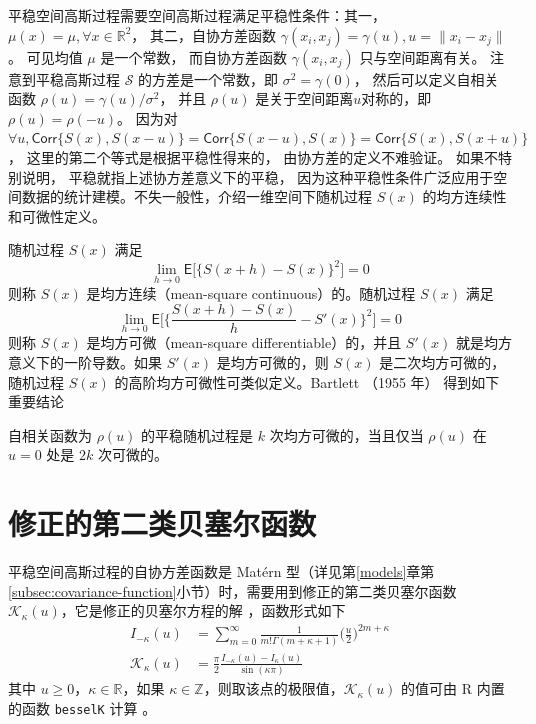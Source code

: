 \documentclass[12pt,a4paper,UTF8,twoside]{book}
\theoremstyle{definition}
\theoremstyle{definition}
\theoremstyle{definition}
\theoremstyle{remark}
\let\BeginKnitrBlock\begin \let\EndKnitrBlock\end
\begin{document}
平稳空间高斯过程需要空间高斯过程满足平稳性条件：其一，
\(\mu(x) = \mu, \forall x \in \mathbb{R}^2\)， 其二，自协方差函数
\(\gamma(x_i,x_j) = \gamma(u),u=\|x_{i} - x_{j}\|\)。 可见均值 \(\mu\)
是一个常数， 而自协方差函数 \(\gamma(x_i,x_j)\) 只与空间距离有关。
注意到平稳高斯过程 \(\mathcal{S}\) 的方差是一个常数，即
\(\sigma^2 = \gamma(0)\)， 然后可以定义自相关函数
\(\rho(u) = \gamma(u)/\sigma^2\)， 并且 \(\rho(u)\)
是关于空间距离\(u\)对称的，即 \(\rho(u) = \rho(-u)\)。 因为对
\(\forall u, \mathsf{Corr}\{S(x),S(x-u)\} = \mathsf{Corr}\{S(x-u), S(x)\} = \mathsf{Corr}\{S(x),S(x+u)\}\)，
这里的第二个等式是根据平稳性得来的， 由协方差的定义不难验证。
如果不特别说明， 平稳就指上述协方差意义下的平稳，
因为这种平稳性条件广泛应用于空间数据的统计建模。不失一般性，介绍一维空间下随机过程
\(S(x)\) 的均方连续性和可微性定义。

\BeginKnitrBlock{definition}[连续性和可微性]
\protect\hypertarget{def:continuous-differentiable}{}{\label{def:continuous-differentiable}
{} }随机过程 \(S(x)\) 满足
\[ \lim_{h \to 0} \mathsf{E}\big[ \{S(x + h) - S(x)\}^{2} \big] = 0 \]
\noindent 则称 \(S(x)\) 是均方连续（mean-square continuous）的。随机过程
\(S(x)\) 满足
\[ \lim_{h \to 0} \mathsf{E} \big[ \{ \frac{S(x+h) - S(x)}{h} - S'(x) \}^2 \big] = 0 \]
\noindent 则称 \(S(x)\) 是均方可微（mean-square differentiable）的，并且
\(S'(x)\) 就是均方意义下的一阶导数。如果 \(S'(x)\) 是均方可微的，则
\(S(x)\) 是二次均方可微的，随机过程 \(S(x)\)
的高阶均方可微性可类似定义\citep{Diggle2007}。Bartlett （1955 年）
\citep{Bartlett1955} 得到如下重要结论
\EndKnitrBlock{definition}

\BeginKnitrBlock{theorem}[平稳随机过程的可微性]
\protect\hypertarget{thm:stationary-mean-square-properties}{}{\label{thm:stationary-mean-square-properties}
{} }自相关函数为 \(\rho(u)\)
的平稳随机过程是 \(k\) 次均方可微的，当且仅当 \(\rho(u)\) 在 \(u = 0\)
处是 \(2k\) 次可微的。
\EndKnitrBlock{theorem}

\hypertarget{sec:modified-bessel-function}{%
\section{修正的第二类贝塞尔函数}\label{sec:modified-bessel-function}}

平稳空间高斯过程的自协方差函数是 Matérn
型（详见第\ref{models}章第\ref{subsec:covariance-function}小节）时，需要用到修正的第二类贝塞尔函数
\(\mathcal{K}_{\kappa}(u)\)，它是修正的贝塞尔方程的解
\citep{Abramowitz1972}，函数形式如下 \begin{equation}
\begin{aligned}
I_{-\kappa}(u) & =  \sum_{m=0}^{\infty} \frac{1}{m!\Gamma(m + \kappa + 1)} \big(\frac{u}{2}\big)^{2m + \kappa} \\
\mathcal{K}_{\kappa}(u) & = \frac{\pi}{2} \frac{I_{-\kappa}(u) - I_{\kappa}(u)}{\sin (\kappa \pi)}
\end{aligned} \label{eq:besselK-function}
\end{equation} \noindent 其中
\(u \geq 0\)，\(\kappa \in \mathbb{R}\)，如果
\(\kappa \in \mathbb{Z}\)，则取该点的极限值，\(\mathcal{K}_{\kappa}(u)\)
的值可由 R 内置的函数 \texttt{besselK} 计算 \citep{Campbell1980}。
\end{document}
